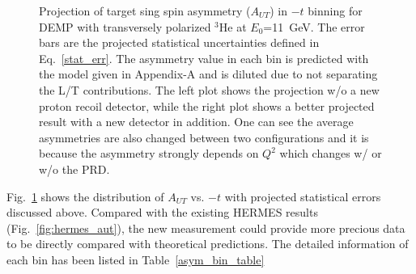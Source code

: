 \begin{figure}[!ht]
 \begin{center}
      \caption{\footnotesize{Projection of target sing spin asymmetry
          ($A_{UT}$) in $-t$ binning for DEMP with transversely polarized
          $\mathrm{^{3}He}$ at $E_{0}$=11~GeV. The error bars are the projected
          statistical uncertainties defined in Eq.~\ref{stat_err}. The
          asymmetry value in each bin is predicted with the model given in Appendix-A and is diluted due to not separating the L/T
          contributions. The left plot shows the projection w/o a new proton
          recoil detector, while the right plot shows a better projected result
          with a new detector in addition. One can see the average asymmetries are also
          changed between two configurations and it is because the asymmetry
          strongly depends on $Q^{2}$ which changes w/ or w/o the PRD.}}
  \label{asym_t}
  \end{center}
\end{figure}
Fig.~\ref{asym_t} shows the distribution of $A_{UT}$ vs. $-t$ with projected
statistical errors discussed above. Compared with the existing HERMES results
(Fig.~\ref{fig:hermes_aut}), the new measurement could provide more precious
data to be directly compared with theoretical predictions. The detailed information of each bin has been listed in Table~\ref{asym_bin_table}
